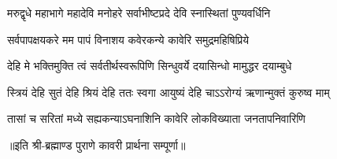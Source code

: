 

\twolineshloka
{मरुद्वृधे महाभागे महादेवि मनोहरे}
{सर्वाभीष्टप्रदे देवि स्नास्थितां पुण्यवर्धिनि}%

\twolineshloka
{सर्वपापक्षयकरे मम पापं विनाशय}
{कवेरकन्ये कावेरि समुद्रमहिषिप्रिये}%

\twolineshloka
{देहि मे भक्तिमुक्ति त्वं सर्वतीर्थस्वरूपिणि}
{सिन्धुवर्ये दयासिन्धो मामुद्धर दयाम्बुधे}%

\twolineshloka
{स्त्रियं देहि सुतं देहि श्रियं देहि ततः स्वगा}
{आयुष्यं देहि चाऽऽरोग्यं ऋणान्मुक्तं कुरुष्व माम्}%

\twolineshloka
{तासां च सरितां मध्ये सह्यकन्याऽघनाशिनि}
{कावेरि लोकविख्याता जनतापनिवारिणि}%

॥इति श्री-ब्रह्माण्ड पुराणे कावरी प्रार्थना सम्पूर्णा॥